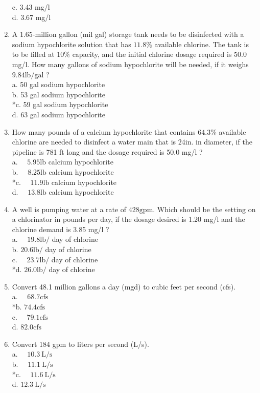 \begin{enumerate}
c. 3.43 mg/l\\
d. 3.67 mg/l\\
  \item A 1.65-million gallon (mil gal) storage tank needs to be disinfected with a sodium hypochlorite solution that has $11.8 \%$ available chlorine. The tank is to be filled at $10 \%$ capacity, and the initial chlorine dosage required is 50.0 mg/l. How many gallons of sodium hypochlorite will be needed, if it weighs $9.84 \mathrm{lb} / \mathrm{gal}$ ?\\
a. 50 gal sodium hypochlorite\\
b. 53 gal sodium hypochlorite\\
*c. 59 gal sodium hypochlorite\\
d. 63 gal sodium hypochlorite\\
  \item How many pounds of a calcium hypochlorite that contains $64.3 \%$ available chlorine are needed to disinfect a water main that is $24 \mathrm{in}$. in diameter, if the pipeline is 781 ft long and the dosage required is 50.0 mg/l ?\\
a. $\quad 5.95 \mathrm{lb}$ calcium hypochlorite\\
b. $\quad 8.25 \mathrm{lb}$ calcium hypochlorite\\
*c. $\quad 11.9 \mathrm{lb}$ calcium hypochlorite\\
d. $\quad 13.8 \mathrm{lb}$ calcium hypochlorite\\
  \item A well is pumping water at a rate of $428 \mathrm{gpm}$. Which should be the setting on a chlorinator in pounds per day, if the dosage desired is 1.20 mg/l and the chlorine demand is 3.85 mg/l ?\\
a. $\quad 19.8 \mathrm{lb} /$ day of chlorine\\
b. $20.6 \mathrm{lb} /$ day of chlorine\\
c. $\quad 23.7 \mathrm{lb} /$ day of chlorine\\
*d. $26.0 \mathrm{lb} /$ day of chlorine\\
  \item Convert 48.1 million gallons a day (mgd) to cubic feet per second (cfs).\\
a. $\quad 68.7 \mathrm{cfs}$\\
*b. $74.4 \mathrm{cfs}$\\
c. $\quad 79.1 \mathrm{cfs}$\\
d. $82.0 \mathrm{cfs}$\\
  \item Convert 184 gpm to liters per second (L/s).\\
a. $\quad 10.3 \mathrm{~L} / \mathrm{s}$\\
b. $\quad 11.1 \mathrm{~L} / \mathrm{s}$\\
*c. $\quad 11.6 \mathrm{~L} / \mathrm{s}$\\
d. $12.3 \mathrm{~L} / \mathrm{s}$ 


\end{enumerate}
